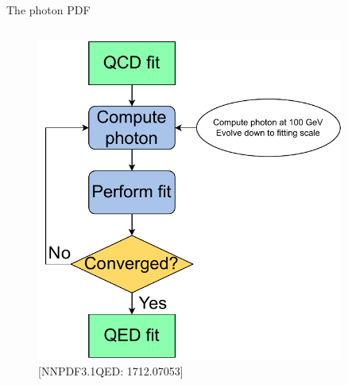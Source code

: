 \documentclass[8pt,t]{beamer}
\begin{document}
\begin{frame}{The photon PDF}
\begin{columns}
    \begin{column}{0.39\textwidth}
      \vspace*{-1.5em}
      \begin{figure}
        \includegraphics[width=0.9\textwidth]{figures/luxqed_iteration.pdf}
        \caption*{\color{gray}\footnotesize [NNPDF3.1QED: 1712.07053]}
      \end{figure}
    \end{column}
  \end{columns}

\end{frame}




\end{document}
